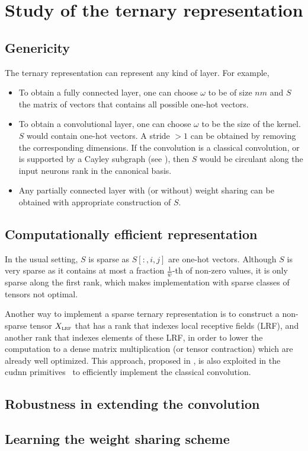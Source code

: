 \section{Study of the ternary representation}

\subsection{Genericity}

The ternary representation can represent any kind of layer. For example,
\begin{itemize}
\item To obtain a fully connected layer, one can choose $\omega$ to be of size $nm$ and $S$ the matrix of vectors that contains all possible one-hot vectors.
\item To obtain a convolutional layer, one can choose $\omega$ to be the size of the kernel. $S$ would contain one-hot vectors. A stride $> 1$ can be obtained by removing the corresponding dimensions. If the convolution is a classical convolution, or is supported by a Cayley subgraph (see ), then $S$ would be circulant along the input neurons rank in the canonical basis.
\item Any partially connected layer with (or without) weight sharing can be obtained with appropriate construction of $S$.
\end{itemize}

\subsection{Computationally efficient representation}

In the usual setting, $S$ is sparse as $S[:,i,j]$ are one-hot vectors. Although $S$ is very sparse as it contains at most a fraction $\frac{1}{w}$-th of non-zero values, it is only sparse along the first rank, which makes implementation with sparse classes of tensors not optimal.

Another way to implement a sparse ternary representation is to construct a non-sparse tensor $X_{\operatorname{\textsc{lrf}}}$ that has a rank that indexes local receptive fields (LRF), and another rank that indexes elements of these LRF, in order to lower the computation to a dense matrix multiplication (or tensor contraction) which are already well optimized. This approach, proposed in \cite{chellapilla2006high}, is also exploited in the cudnn primitives~\citep{chetlur2014cudnn} to efficiently implement the classical convolution.



\subsection{Robustness in extending the convolution}

\subsection{Learning the weight sharing scheme}
